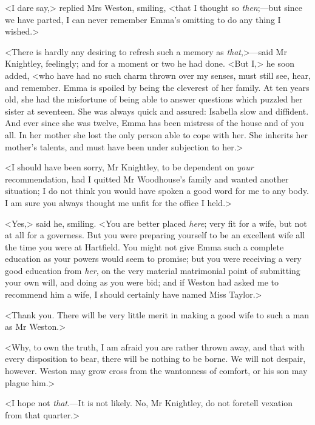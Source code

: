 <I dare say,> replied Mrs Weston, smiling, <that I thought so \textit{then};—but since we have parted, I can never remember Emma's omitting to do any thing I wished.>

<There is hardly any desiring to refresh such a memory as \textit{that},>—said Mr Knightley, feelingly; and for a moment or two he had done. <But I,> he soon added, <who have had no such charm thrown over my senses, must still see, hear, and remember. Emma is spoiled by being the cleverest of her family. At ten years old, she had the misfortune of being able to answer questions which puzzled her sister at seventeen. She was always quick and assured: Isabella slow and diffident. And ever since she was twelve, Emma has been mistress of the house and of you all. In her mother she lost the only person able to cope with her. She inherits her mother's talents, and must have been under subjection to her.>

<I should have been sorry, Mr Knightley, to be dependent on \textit{your} recommendation, had I quitted Mr Woodhouse's family and wanted another situation; I do not think you would have spoken a good word for me to any body. I am sure you always thought me unfit for the office I held.>

<Yes,> said he, smiling. <You are better placed \textit{here}; very fit for a wife, but not at all for a governess. But you were preparing yourself to be an excellent wife all the time you were at Hartfield. You might not give Emma such a complete education as your powers would seem to promise; but you were receiving a very good education from \textit{her}, on the very material matrimonial point of submitting your own will, and doing as you were bid; and if Weston had asked me to recommend him a wife, I should certainly have named Miss Taylor.>

<Thank you. There will be very little merit in making a good wife to such a man as Mr Weston.>

<Why, to own the truth, I am afraid you are rather thrown away, and that with every disposition to bear, there will be nothing to be borne. We will not despair, however. Weston may grow cross from the wantonness of comfort, or his son may plague him.>

<I hope not \textit{that}.—It is not likely. No, Mr Knightley, do not foretell vexation from that quarter.>

